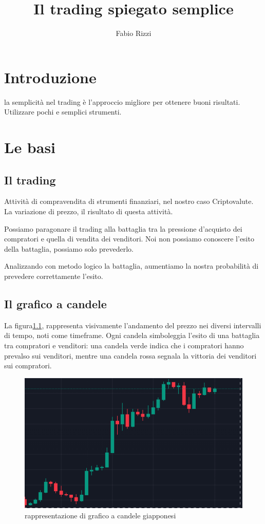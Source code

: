 \documentclass[10pt,a4paper,titlepage]{book}
\author{Fabio Rizzi}
\title{Il trading spiegato semplice}
\begin{document}
\maketitle
\tableofcontents%
\chapter*{Introduzione}
la semplicità nel trading è l'approccio migliore per ottenere buoni risultati.\\
Utilizzare pochi e semplici strumenti.
\newpage
\chapter{Le basi}
\section{Il trading} 
Attività di compravendita di strumenti finanziari, nel nostro caso Criptovalute. La variazione di prezzo, il risultato di questa attività.

Possiamo paragonare il trading alla battaglia tra la pressione d'acquisto dei compratori e quella di vendita dei venditori. Noi non possiamo conoscere l'esito della battaglia, possiamo solo prevederlo.

Analizzando con metodo logico la battaglia, aumentiamo la nostra probabilità di prevedere correttamente l'esito.

\section{Il grafico a candele} La figura\ref{graficocandele}, rappresenta visivamente l'andamento del prezzo nei diversi intervalli di tempo, noti come timeframe. Ogni candela simboleggia l'esito di una battaglia tra compratori e venditori: una candela verde indica che i compratori hanno prevalso sui venditori, mentre una candela rossa segnala la vittoria dei venditori sui compratori.

\begin{figure}[hbtp]
\centering
\includegraphics[scale=0.5]{Immagini/grafico-candele.png}
\caption{rappresentazione di grafico a candele giapponesi}
\label{graficocandele} %
\end{figure}
\end{document}
